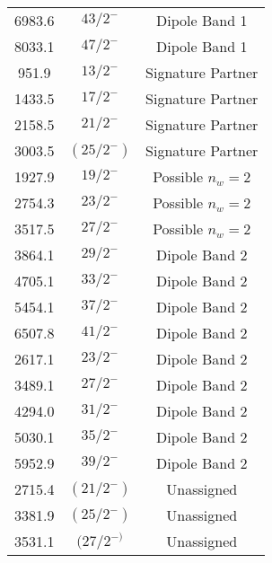 \begin{center}
\begin{longtable}{|c|c|c|}
 6983.6 & $ 43/2^{-} $ & Dipole Band 1 \\
 8033.1 & $ 47/2^{-} $ & Dipole Band 1 \\
 951.9 & $ 13/2^{-} $ & Signature Partner \\
 1433.5 & $ 17/2^{-} $ & Signature Partner \\
 2158.5 & $ 21/2^{-} $ & Signature Partner \\
 3003.5 & $ (25/2^{-}) $ & Signature Partner \\
 1927.9 & $ 19/2^{-} $ & Possible $n_w=2$ \\
 2754.3 & $ 23/2^{-} $ & Possible $n_w=2$ \\
 3517.5 & $ 27/2^{-} $ & Possible $n_w=2$ \\
 3864.1 & $ 29/2^{-} $ & Dipole Band 2 \\
 4705.1 & $ 33/2^{-} $ & Dipole Band 2 \\
 5454.1 & $ 37/2^{-} $ & Dipole Band 2 \\
 6507.8 & $ 41/2^{-} $ & Dipole Band 2 \\
 2617.1 & $ 23/2^{-} $ & Dipole Band 2 \\
 3489.1 & $ 27/2^{-} $ & Dipole Band 2 \\
 4294.0 & $ 31/2^{-} $ & Dipole Band 2 \\
 5030.1 & $ 35/2^{-} $ & Dipole Band 2 \\
 5952.9 & $ 39/2^{-} $ & Dipole Band 2 \\
 2715.4 & $ (21/2^{-}) $ & Unassigned \\
 3381.9 & $ (25/2^{-}) $ & Unassigned \\
 3531.1 & $ (27/2^{-)} $ & Unassigned \\
\end{longtable}
\end{center}


